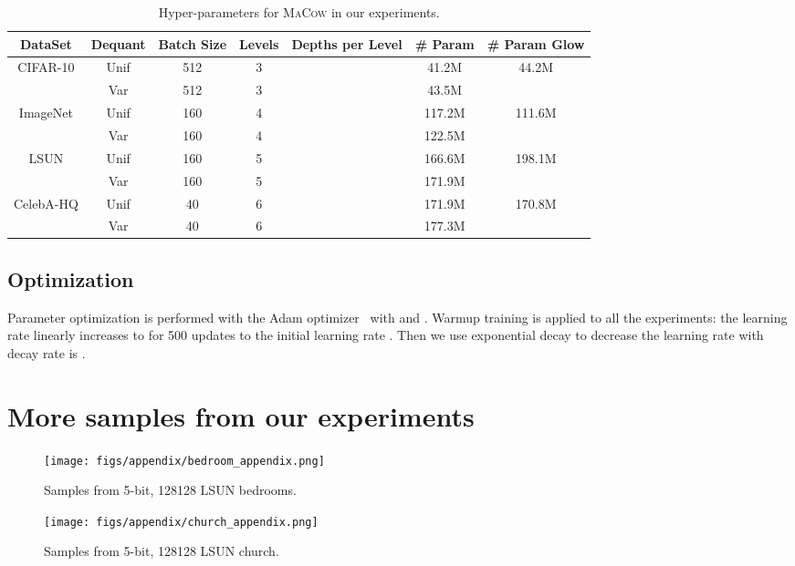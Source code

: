\documentclass{article}
\begin{document}
\begin{table}[h]
\caption{Hyper-parameters for \textsc{MaCow} in our experiments.}
\label{tab:my_label}
\centering
\resizebox{1.0\columnwidth}{!}
{
\begin{tabular}[t]{c|c|c|c|c|c|c}
\toprule
DataSet &  Dequant & Batch Size & Levels & Depths per Level & \# Param & \# Param Glow \\
\midrule
\multirow{2}{*}{CIFAR-10} & Unif & 512 & 3 &  & 41.2M & \multirow{2}{*}{44.2M} \\
 & Var  & 512 & 3 &  & 43.5M &  \\
\midrule
\multirow{2}{*}{ImageNet} & Unif & 160 & 4 &  & 117.2M & \multirow{2}{*}{111.6M} \\
 & Var & 160 & 4 &  & 122.5M &  \\
\midrule
\multirow{2}{*}{LSUN} & Unif & 160 & 5 &  & 166.6M & \multirow{2}{*}{198.1M} \\
 & Var & 160 & 5 &  & 171.9M & \\
\midrule
\multirow{2}{*}{CelebA-HQ} & Unif & 40 & 6 &  & 171.9M & \multirow{2}{*}{170.8M} \\
 & Var & 40 & 6 &  & 177.3M & \\
\bottomrule
\end{tabular}
}
\end{table}

\subsection{Optimization}
Parameter optimization is performed with the Adam optimizer~\citep{kingma2014adam} with  and . 
Warmup training is applied to all the experiments: the learning rate linearly increases to  for 500 updates to the initial learning rate .
Then we use exponential decay to decrease the learning rate with decay rate is .

\newpage
\section{More samples from our experiments}\label{appendix:samples}

\begin{figure}[h]
    \centering
    \texttt{[image: figs/appendix/bedroom\_appendix.png]}
    \caption{Samples from 5-bit, 128128 LSUN bedrooms.}
    \label{fig:bedroom}
\end{figure}

\newpage
\begin{figure}[t]
    \centering
    \texttt{[image: figs/appendix/church\_appendix.png]}
    \caption{Samples from 5-bit, 128128 LSUN church.}
    \label{fig:church}
\end{figure}
\end{document}
